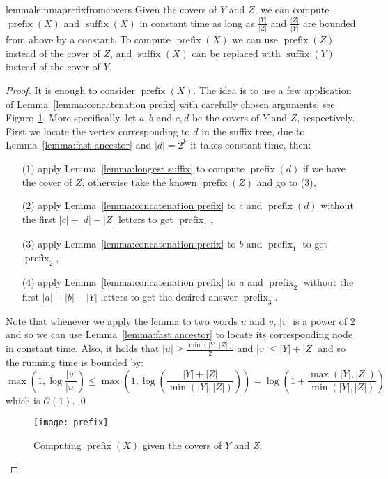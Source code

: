 \documentclass[runningheads]{llncs}
\DeclareMathOperator{\prefix}{prefix}
\DeclareMathOperator{\suffix}{suffix}
\begin{document}
\begin{restatable}{lemma}{lemmaprefixfromcovers}
\label{lemma:prefix from covers}
Given the covers of $Y$ and $Z$, we can compute $\prefix(X)$ and $\suffix(X)$ in constant time as long as $\frac{|Y|}{|Z|}$ and $\frac{|Z|}{|Y|}$ are bounded from above by a constant. To compute $\prefix(X)$ we can use $\prefix(Z)$ instead of the cover of $Z$, and $\suffix(X)$ can be replaced with $\suffix(Y)$ instead of the cover of $Y$.
\end{restatable}

\begin{proof}
It is enough to consider $\prefix(X)$. The idea is to use a few application of Lemma~\ref{lemma:concatenation prefix} with carefully chosen arguments, see Figure~\ref{figure:prefix}. More specifically, let $a,b$ and $c,d$ be the covers of $Y$ and $Z$, respectively. First we locate the vertex corresponding to $d$ in the suffix tree, due to Lemma~\ref{lemma:fast ancestor} and $|d|=2^k$ it takes constant time, then:
\begin{enumerate}
\item[(1)] apply Lemma~\ref{lemma:longest suffix} to compute $\prefix(d)$ if we have the cover of $Z$, otherwise take the known $\prefix(Z)$ and go to (3),
\item[(2)] apply Lemma~\ref{lemma:concatenation prefix} to $c$ and $\prefix(d)$ without the first $|c|+|d|-|Z|$ letters to get $\prefix_1$,
\item[(3)] apply Lemma~\ref{lemma:concatenation prefix} to $b$ and $\prefix_1$ to get $\prefix_2$,
\item[(4)] apply Lemma~\ref{lemma:concatenation prefix} to $a$ and $\prefix_2$ without the first $|a|+|b|-|Y|$ letters to get the desired answer $\prefix_3$.
\end{enumerate}
Note that whenever we apply the lemma to two words $u$ and $v$, $|v|$ is a power of $2$ and so we can use Lemma~\ref{lemma:fast ancestor} to locate its corresponding node in constant time. Also, it holds that $|u|\geq\frac{\min(|Y|,|Z|)}{2}$ and $|v|\leq |Y|+|Z|$ and so the running time is bounded by:
$$
 \max\left(1,\log\frac{|v|}{|u|}\right) \leq \max\left(1, \log\left(\frac{|Y|+|Z|}{\min(|Y|,|Z|)}\right)\right) = \log\left(1+\frac{\max(|Y|,|Z|)}{\min(|Y|,|Z|)}\right)
$$
which is $\mathcal{O}(1)$.
\qed

\begin{figure}
\centering
\texttt{[image: prefix]}
\caption{Computing $\prefix(X)$ given the covers of $Y$ and $Z$.}
\label{figure:prefix}
\end{figure}

\end{proof}
\end{document}
